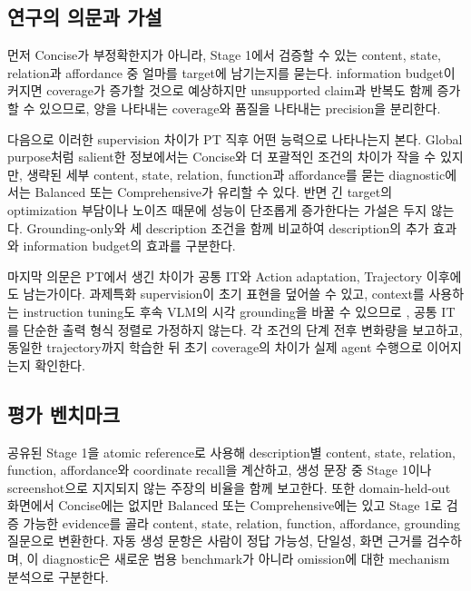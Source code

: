 

\subsection{연구의 의문과 가설}

먼저 Concise가 부정확한지가 아니라, Stage 1에서 검증할 수 있는
content, state, relation과 affordance 중 얼마를 target에 남기는지를
묻는다. information budget이 커지면 coverage가 증가할 것으로
예상하지만 unsupported claim과 반복도 함께 증가할 수 있으므로,
양을 나타내는 coverage와 품질을 나타내는 precision을 분리한다.

다음으로 이러한 supervision 차이가 PT 직후 어떤 능력으로
나타나는지 본다. Global purpose처럼 salient한 정보에서는 Concise와
더 포괄적인 조건의 차이가 작을 수 있지만, 생략된 세부 content,
state, relation, function과 affordance를 묻는 diagnostic에서는
Balanced 또는 Comprehensive가 유리할 수 있다. 반면 긴 target의
optimization 부담이나 노이즈 때문에 성능이 단조롭게 증가한다는
가설은 두지 않는다. Grounding-only와 세 description 조건을 함께
비교하여 description의 추가 효과와 information budget의 효과를
구분한다.

마지막 의문은 PT에서 생긴 차이가 공통 IT와 Action adaptation,
Trajectory 이후에도 남는가이다. 과제특화 supervision이 초기
표현을 덮어쓸 수 있고, context를 사용하는 instruction tuning도
후속 VLM의 시각 grounding을 바꿀 수 있으므로
\citep{lee2026contextit}, 공통 IT를 단순한 출력 형식 정렬로
가정하지 않는다. 각 조건의 단계 전후 변화량을 보고하고, 동일한
trajectory까지 학습한 뒤 초기 coverage의 차이가 실제 agent
수행으로 이어지는지 확인한다.

\subsection{평가 벤치마크}

공유된 Stage 1을 atomic reference로 사용해 description별 content,
state, relation, function, affordance와 coordinate recall을
계산하고, 생성 문장 중 Stage 1이나 screenshot으로 지지되지 않는
주장의 비율을 함께 보고한다. 또한 domain-held-out 화면에서
Concise에는 없지만 Balanced 또는 Comprehensive에는 있고 Stage 1로
검증 가능한 evidence를 골라 content, state, relation, function,
affordance, grounding 질문으로 변환한다. 자동 생성 문항은 사람이
정답 가능성, 단일성, 화면 근거를 검수하며, 이 diagnostic은 새로운
범용 benchmark가 아니라 omission에 대한 mechanism 분석으로
구분한다.

